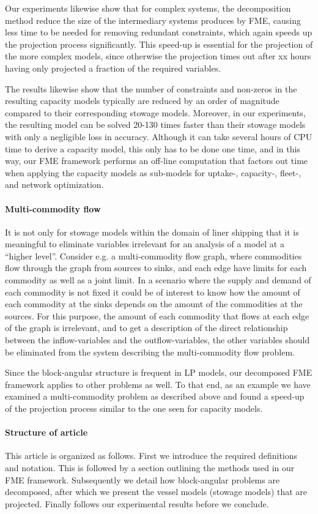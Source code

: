 Our experiments likewise show that for complex systems, the decomposition method reduce the size of the intermediary systems produces by FME, causing less time to be needed for removing redundant constraints, which again speeds up the projection process significantly. This speed-up is essential for the projection of the more complex models, since otherwise the projection times out after xx hours having only projected a fraction of the required variables.

The results likewise show that the number of constraints and non-zeros in the resulting capacity models typically are reduced by an order of magnitude compared to their corresponding stowage models. Moreover, in our experiments, the resulting model can be solved 20-130 times faster than their stowage models with only a negligible loss in accuracy. Although it can take several hours of CPU time to derive a capacity model, this only has to be done one time, and in this way, our FME framework performs an off-line computation that factors out time when applying the capacity models as sub-models for uptake-, capacity-, fleet-, and network optimization.

\paragraph{Multi-commodity flow}
It is not only for stowage models within the domain of liner shipping that it is meaningful to eliminate variables irrelevant for an analysis of a model at a ``higher level''. Consider e.g. a multi-commodity flow graph, where commodities flow through the graph from sources to sinks, and each edge have limits for each commodity as well as a joint limit. In a scenario where the supply and demand of each commodity is not fixed it could be of interest to know how the amount of each commodity at the sinks depends on the amount of the commodities at the sources. For this purpose, the amount of each commodity that flows at each edge of the graph is irrelevant, and to get a description of the direct relationship between the inflow-variables and the outflow-variables, the other variables should be eliminated from the system describing the multi-commodity flow problem.

Since the block-angular structure is frequent in LP models, our decomposed FME framework applies to other problems as well. To that end, as an example we have examined a multi-commodity problem as described above and found a speed-up of the projection process similar to the one seen for capacity models.

\paragraph{Structure of article}
This article is organized as follows. First we introduce the required definitions and notation. This is followed by a section outlining the methods used in our FME framework. Subsequently we detail how block-angular problems are decomposed, after which we present the vessel models (stowage models) that are projected. Finally follows our experimental results before we conclude.

%

%
